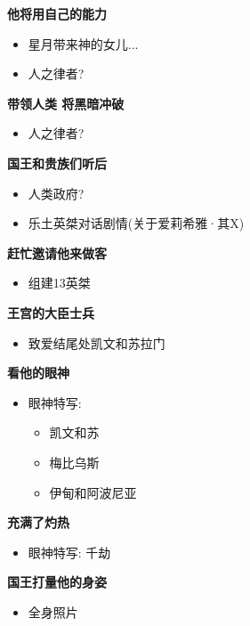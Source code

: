 \documentclass[a4paper]{article}
\begin{document}
\textbf{他将用自己的能力}

\begin{itemize}
    \item 星月带来神的女儿...
    \item 人之律者?
\end{itemize}


\textbf{带领人类 将黑暗冲破}

\begin{itemize}
    \item 人之律者?
\end{itemize}

\textbf{国王和贵族们听后}

\begin{itemize}
    \item 人类政府?
    \item 乐土英桀对话剧情(关于爱莉希雅·其X)
\end{itemize}

\textbf{赶忙邀请他来做客}

\begin{itemize}
    \item 组建13英桀
\end{itemize}

\textbf{王宫的大臣士兵}

\begin{itemize}
    \item 致爱结尾处凯文和苏拉门
\end{itemize}

\textbf{看他的眼神}

\begin{itemize}
    \item 眼神特写:
    \begin{itemize}
        \item 凯文和苏
        \item 梅比乌斯
        \item 伊甸和阿波尼亚
    \end{itemize}
\end{itemize}

\textbf{充满了灼热}

\begin{itemize}
    \item 眼神特写: 千劫
\end{itemize}

\textbf{国王打量他的身姿}

\begin{itemize}
    \item 全身照片
\end{itemize}
\end{document}
